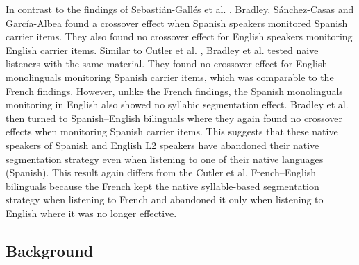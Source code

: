 In contrast to the findings of Sebastián-Gallés et al. \parencite*{Sebastian-Galles1992-xd} , Bradley, Sánchez-Casas and García-Albea \parencite*{Bradley1993-qq}  found a crossover effect when Spanish speakers monitored Spanish carrier items. They also found no crossover effect for English speakers monitoring English carrier items. Similar to Cutler et al. \parencite*{Cutler1986-zl}, Bradley et al. \parencite*{Bradley1993-qq}  tested naive listeners with the same material. They found no crossover effect for English monolinguals monitoring Spanish carrier items, which was comparable to the French findings. However, unlike the French findings, the Spanish monolinguals monitoring in English also showed no syllabic segmentation effect. Bradley et al. \parencite*{Bradley1993-qq} then turned to Spanish–English bilinguals where they again found no crossover effects when monitoring Spanish carrier items. This suggests that these native speakers of Spanish and English L2 speakers have abandoned their native segmentation strategy even when listening to one of their native languages (Spanish). This result again differs from the Cutler et al. \parencite*{Cutler1986-zl} French–English bilinguals because the French kept the native syllable-based segmentation strategy when listening to French and abandoned it only when listening to English where it was no longer effective.



\subsection{Background}



